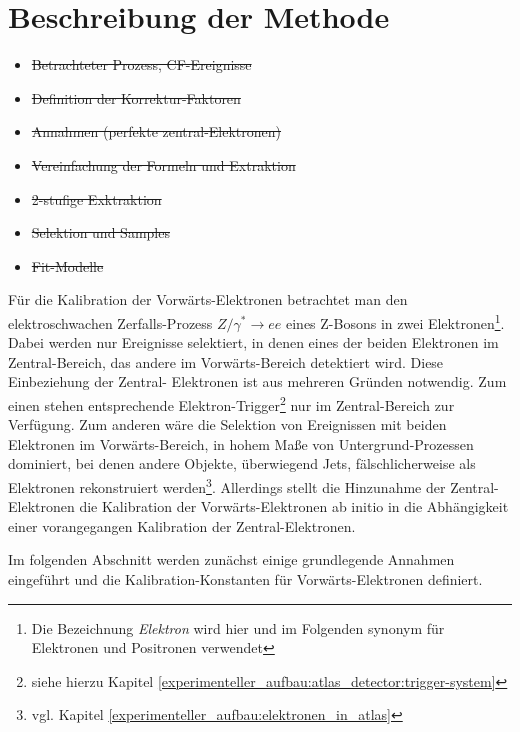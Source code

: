 %
\section{Beschreibung der Methode}
\label{energy_calibration:beschreibung_der_methode}

\begin{itemize}
    \item \sout{Betrachteter Prozess, CF-Ereignisse}
    \item \sout{Definition der Korrektur-Faktoren}
    \item \sout{Annahmen (perfekte zentral-Elektronen)}
    \item \sout{Vereinfachung der Formeln und Extraktion}
    \item \sout{2-stufige Exktraktion}
    \item \sout{Selektion und Samples}
    \item \sout{Fit-Modelle}
\end{itemize}

Für die Kalibration der Vorwärts-Elektronen betrachtet man den elektroschwachen
Zerfalls-Prozess $Z/\gamma^* \rightarrow ee$ eines Z-Bosons in zwei
Elektronen\footnote{Die Bezeichnung \textit{Elektron} wird hier und im
Folgenden synonym für Elektronen und Positronen verwendet}. Dabei werden nur
Ereignisse selektiert, in denen eines der beiden Elektronen im Zentral-Bereich,
das andere im Vorwärts-Bereich detektiert wird. Diese Einbeziehung der Zentral-
Elektronen ist aus mehreren Gründen notwendig. Zum einen stehen entsprechende
Elektron-Trigger\footnote{siehe hierzu Kapitel
\ref{experimenteller_aufbau:atlas_detector:trigger-system}}
nur im Zentral-Bereich zur Verfügung. Zum anderen wäre die Selektion von
Ereignissen mit beiden Elektronen im Vorwärts-Bereich, in hohem Maße von
Untergrund-Prozessen dominiert, bei denen andere Objekte, überwiegend Jets,
fälschlicherweise als Elektronen rekonstruiert werden\footnote{vgl. Kapitel
\ref{experimenteller_aufbau:elektronen_in_atlas}}.
Allerdings stellt die Hinzunahme der Zentral-Elektronen die Kalibration der
Vorwärts-Elektronen ab initio in die Abhängigkeit einer vorangegangen 
Kalibration der Zentral-Elektronen.

Im folgenden Abschnitt werden zunächst einige grundlegende Annahmen eingeführt
und die Kalibration-Konstanten für Vorwärts-Elektronen definiert.



